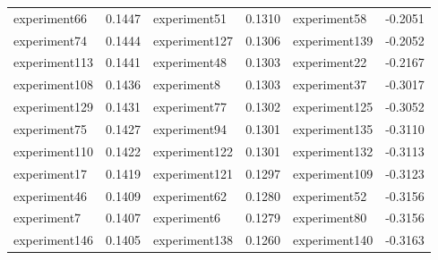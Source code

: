 \begin{table}[ht]
{\begin{tabular}{lr@{\hspace{1cm}}lr@{\hspace{1cm}}lr}
            experiment66                          & 0.1447                    & experiment51                     & 0.1310                     & experiment58                    & -0.2051                    \\
            experiment74                          & 0.1444                    & experiment127                    & 0.1306                     & experiment139                   & -0.2052                    \\
            experiment113                         & 0.1441                    & experiment48                     & 0.1303                     & \cellcolor{gray!25}experiment22 & \cellcolor{gray!25}-0.2167 \\
            experiment108                         & 0.1436                    & experiment8                      & 0.1303                     & \cellcolor{gray!25}experiment37 & \cellcolor{gray!25}-0.3017 \\
            experiment129                         & 0.1431                    & experiment77                     & 0.1302                     & experiment125                   & -0.3052                    \\
            experiment75                          & 0.1427                    & experiment94                     & 0.1301                     & experiment135                   & -0.3110                    \\
            experiment110                         & 0.1422                    & experiment122                    & 0.1301                     & experiment132                   & -0.3113                    \\
            experiment17                          & 0.1419                    & experiment121                    & 0.1297                     & experiment109                   & -0.3123                    \\
            experiment46                          & 0.1409                    & experiment62                     & 0.1280                     & experiment52                    & -0.3156                    \\
            experiment7                           & 0.1407                    & experiment6                      & 0.1279                     & experiment80                    & -0.3156                    \\
            experiment146                         & 0.1405                    & experiment138                    & 0.1260                     & experiment140                   & -0.3163                    \\

\end{tabular}}
\end{table}

